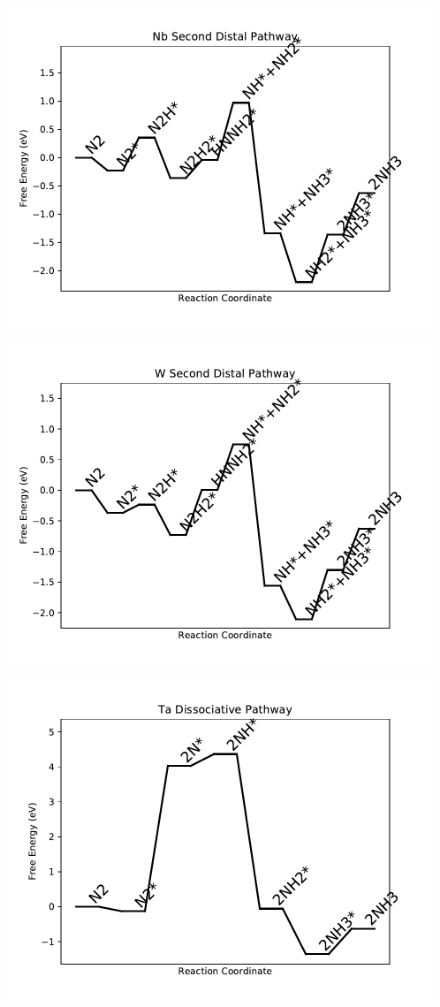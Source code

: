 \begin{figure}
\includegraphics[width=0.8\linewidth]{data/plots/Nb_distal_2.pdf}
\label{fig:Nb_distal_2}
\end{figure}

\begin{figure}
\includegraphics[width=0.8\linewidth]{data/plots/W_distal_2.pdf}
\label{fig:W_distal_2}
\end{figure}

\begin{figure}
\includegraphics[width=0.8\linewidth]{data/plots/Ta_dissociative.pdf}
\label{fig:Ta_dissociative}
\end{figure}

